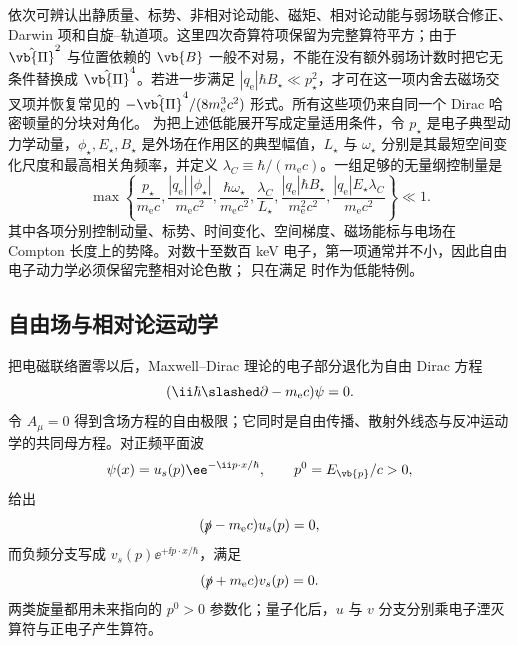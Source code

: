 依次可辨认出静质量、标势、非相对论动能、磁矩、相对论动能与弱场联合修正、Darwin 项和自旋--轨道项。这里四次奇算符项保留为完整算符平方；由于 $\hat{\vb{\Pi}}^2$ 与位置依赖的 $\vb{B}$ 一般不对易，不能在没有额外弱场计数时把它无条件替换成 $\hat{\vb{\Pi}}^4$。若进一步满足 $|q_{\mathrm e}|\hbar B_\star\ll p_\star^2$，才可在这一项内舍去磁场交叉项并恢复常见的 $-\hat{\vb{\Pi}}^4/(8m_{\mathrm e}^3c^2)$ 形式。所有这些项仍来自同一个 Dirac 哈密顿量的分块对角化。
为把上述低能展开写成定量适用条件，令 $p_\star$ 是电子典型动力学动量，$\phi_\star,E_\star,B_\star$ 是外场在作用区的典型幅值，$L_\star$ 与 $\omega_\star$ 分别是其最短空间变化尺度和最高相关角频率，并定义 $\lambda_C\equiv\hbar/(m_{\mathrm e} c)$。一组足够的无量纲控制量是
\begin{equation}
 \max\!\left\{
 \frac{p_\star}{m_{\mathrm e} c},
 \frac{|q_{\mathrm e}|\,|\phi_\star|}{m_{\mathrm e} c^2},
 \frac{\hbar\omega_\star}{m_{\mathrm e} c^2},
 \frac{\lambda_C}{L_\star},
 \frac{|q_{\mathrm e}|\hbar B_\star}{m_{\mathrm e}^2c^2},
 \frac{|q_{\mathrm e}|E_\star\lambda_C}{m_{\mathrm e} c^2}
 \right\}\ll1.
 \label{eq:fw-control-set-r16}
\end{equation}
其中各项分别控制动量、标势、时间变化、空间梯度、磁场能标与电场在 Compton 长度上的势降。对数十至数百 keV 电子，第一项通常并不小，因此自由电子动力学必须保留完整相对论色散； 只在满足  时作为低能特例。

\subsection{自由场与相对论运动学}\label{sec:feqo-positive-spinor}

把电磁联络置零以后，Maxwell--Dirac 理论的电子部分退化为自由 Dirac 方程
\begin{equation}
 (\ii\hbar\slashed\partial-m_{\mathrm e} c)\psi=0.
 \label{eq:free-dirac}\end{equation}
令 $A_\mu=0$ 得到含场方程的自由极限；它同时是自由传播、散射外线态与反冲运动学的共同母方程。对正频平面波
\begin{equation*}
 \psi(x)=u_s(p)\ee^{-\ii p\cdot x/\hbar},
 \qquad p^0=E_{\vb{p}}/c>0,
\end{equation*}
 给出
\begin{equation}
 (\slashed p-m_{\mathrm e} c)u_s(p)=0,
 \label{eq:u-dirac}
\end{equation}
而负频分支写成 $v_s(p)\ee^{+\ii p\cdot x/\hbar}$，满足
\begin{equation}
 (\slashed p+m_{\mathrm e} c)v_s(p)=0.
 \label{eq:v-dirac}
\end{equation}
两类旋量都用未来指向的 $p^0>0$ 参数化；量子化后，$u$ 与 $v$ 分支分别乘电子湮灭算符与正电子产生算符。

